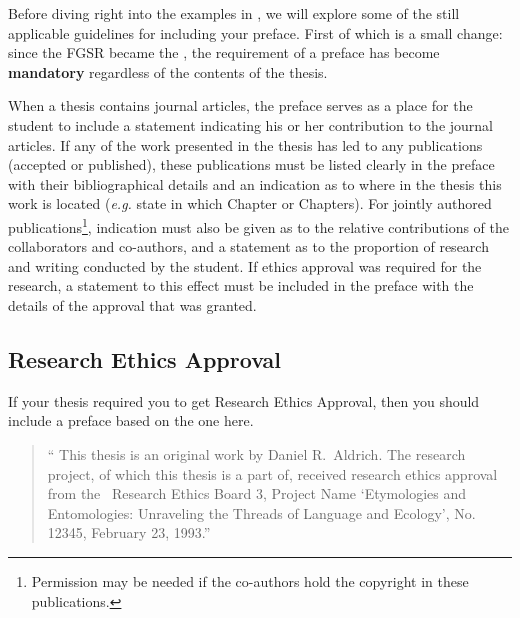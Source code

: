 		Before diving right into the examples in , we will explore some of the still applicable guidelines for including your preface.
		First of which is a small change: since the FGSR became the \Fac, the requirement of a preface has become \textbf{mandatory} regardless of the contents of the thesis.

		When a thesis contains journal articles, the preface serves as a place for the student to include a statement indicating his or her contribution to the journal articles. 
		If any of the work presented in the thesis has led to any publications (accepted or published), these publications must be listed clearly in the preface with their bibliographical details and an indication as to where in the thesis this work is located (\textit{e.g.} state in which Chapter or Chapters). 
		For jointly authored publications\footnote{Permission may be needed if the co-authors hold the copyright in these publications.}, indication must also be given as to the relative contributions of the collaborators and co-authors, and a statement as to the proportion of research and writing conducted by the student.
		If ethics approval was required for the research, a statement to this effect must be included in the preface with the details of the approval that was granted. 




		\subsection{Research Ethics Approval}\label{preface:REA}
			If your thesis required you to get Research Ethics Approval, then you should include a preface based on the one here.
	
			\begin{quote}
				\singlespacing
				\enquote{%
					This thesis is an original work by Daniel R.\ Aldrich. 
					The research project, of which this thesis is a part of, received research ethics approval from the \University\ Research Ethics Board 3, Project Name \enquote{Etymologies and Entomologies: Unraveling the Threads of Language and Ecology}, No. 12345, February 23, 1993.}%
			\end{quote}

